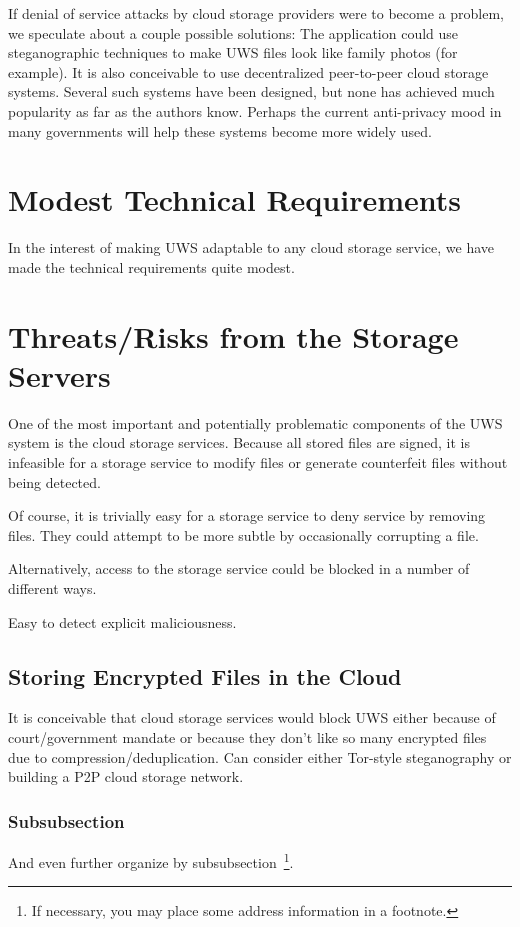 \documentclass{sig-alternate-hotpets}
\begin{document}
If denial of service attacks by cloud storage providers were to become a problem, we speculate about a couple possible solutions:
The application could use steganographic techniques to make UWS files look like family photos (for example).
It is also conceivable to use decentralized peer-to-peer cloud storage systems.
Several such systems have been designed, but none has achieved much popularity as far as the authors know.
Perhaps the current anti-privacy mood in many governments will help these systems become more widely used.

\section{Modest Technical Requirements}

In the interest of making UWS adaptable to any cloud storage service, we have made the technical requirements quite modest.

\section{Threats/Risks from the Storage Servers}

One of the most important and potentially problematic components of the UWS system is the cloud storage services.
Because all stored files are signed, it is infeasible for a storage service to modify files or generate counterfeit files without being detected.

Of course, it is trivially easy for a storage service to deny service by removing files.
They could attempt to be more subtle by occasionally corrupting a file.

Alternatively, access to the storage service could be blocked in a number of different ways.

Easy to detect explicit maliciousness.

\subsection{Storing Encrypted Files in the Cloud}

It is conceivable that cloud storage services would block UWS either because of court/government mandate or because they don't like so many encrypted files due to compression/deduplication.
Can consider either Tor-style steganography or building a P2P cloud storage network.

\subsubsection{Subsubsection}
And even further organize by subsubsection~\footnote{If necessary, you may place some address information in a footnote.}.
\end{document}
